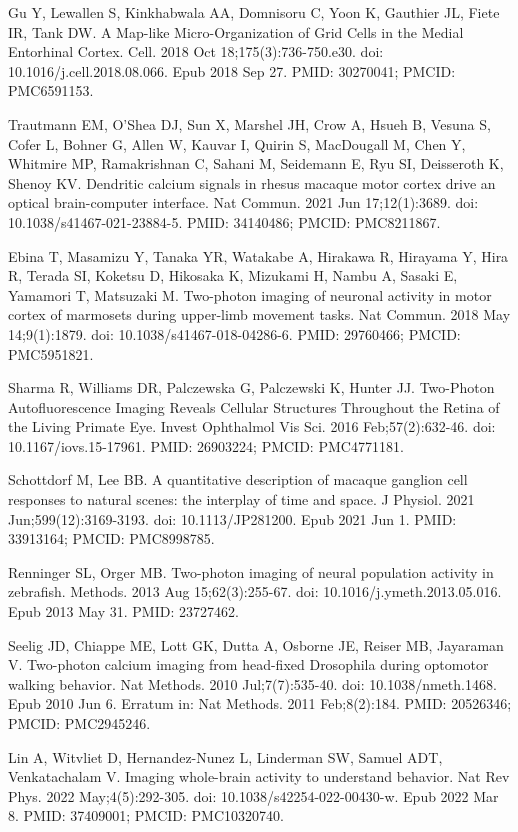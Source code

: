 \documentclass[10pt,letterpaper]{article}
\begin{document}
\begin{thebibliography}{10}
Gu Y, Lewallen S, Kinkhabwala AA, Domnisoru C, Yoon K, Gauthier JL, Fiete IR, Tank DW. A Map-like Micro-Organization of Grid Cells in the Medial Entorhinal Cortex. Cell. 2018 Oct 18;175(3):736-750.e30. doi: 10.1016/j.cell.2018.08.066. Epub 2018 Sep 27. PMID: 30270041; PMCID: PMC6591153.

Trautmann EM, O'Shea DJ, Sun X, Marshel JH, Crow A, Hsueh B, Vesuna S, Cofer L, Bohner G, Allen W, Kauvar I, Quirin S, MacDougall M, Chen Y, Whitmire MP, Ramakrishnan C, Sahani M, Seidemann E, Ryu SI, Deisseroth K, Shenoy KV. Dendritic calcium signals in rhesus macaque motor cortex drive an optical brain-computer interface. Nat Commun. 2021 Jun 17;12(1):3689. doi: 10.1038/s41467-021-23884-5. PMID: 34140486; PMCID: PMC8211867.

Ebina T, Masamizu Y, Tanaka YR, Watakabe A, Hirakawa R, Hirayama Y, Hira R, Terada SI, Koketsu D, Hikosaka K, Mizukami H, Nambu A, Sasaki E, Yamamori T, Matsuzaki M. Two-photon imaging of neuronal activity in motor cortex of marmosets during upper-limb movement tasks. Nat Commun. 2018 May 14;9(1):1879. doi: 10.1038/s41467-018-04286-6. PMID: 29760466; PMCID: PMC5951821.

Sharma R, Williams DR, Palczewska G, Palczewski K, Hunter JJ. Two-Photon Autofluorescence Imaging Reveals Cellular Structures Throughout the Retina of the Living Primate Eye. Invest Ophthalmol Vis Sci. 2016 Feb;57(2):632-46. doi: 10.1167/iovs.15-17961. PMID: 26903224; PMCID: PMC4771181.

Schottdorf M, Lee BB. A quantitative description of macaque ganglion cell responses to natural scenes: the interplay of time and space. J Physiol. 2021 Jun;599(12):3169-3193. doi: 10.1113/JP281200. Epub 2021 Jun 1. PMID: 33913164; PMCID: PMC8998785.

Renninger SL, Orger MB. Two-photon imaging of neural population activity in zebrafish. Methods. 2013 Aug 15;62(3):255-67. doi: 10.1016/j.ymeth.2013.05.016. Epub 2013 May 31. PMID: 23727462.

Seelig JD, Chiappe ME, Lott GK, Dutta A, Osborne JE, Reiser MB, Jayaraman V. Two-photon calcium imaging from head-fixed Drosophila during optomotor walking behavior. Nat Methods. 2010 Jul;7(7):535-40. doi: 10.1038/nmeth.1468. Epub 2010 Jun 6. Erratum in: Nat Methods. 2011 Feb;8(2):184. PMID: 20526346; PMCID: PMC2945246.

Lin A, Witvliet D, Hernandez-Nunez L, Linderman SW, Samuel ADT, Venkatachalam V. Imaging whole-brain activity to understand behavior. Nat Rev Phys. 2022 May;4(5):292-305. doi: 10.1038/s42254-022-00430-w. Epub 2022 Mar 8. PMID: 37409001; PMCID: PMC10320740.


\end{thebibliography}
\end{document}
